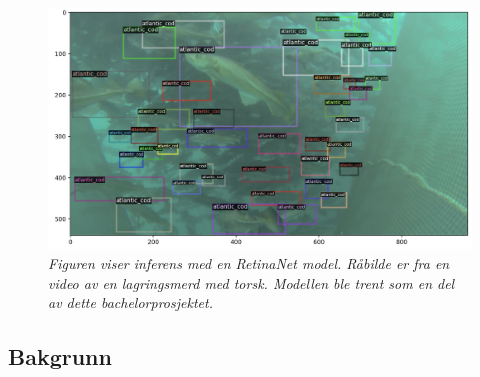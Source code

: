 \begin{figure}
\begin{center} 
\includegraphics[scale=0.35]{figures/retinanet_cod_2}
\caption{\small \sl Figuren viser inferens med en RetinaNet model. Råbilde er fra en video av en lagringsmerd med torsk. Modellen ble trent som en del av dette bachelorprosjektet. \label{fig:inference}} 
\end{center} 
\end{figure} 



\subsection{Bakgrunn}

